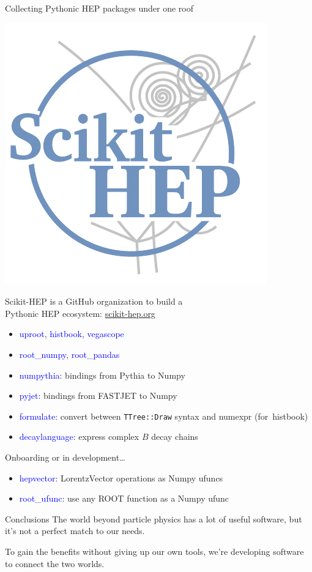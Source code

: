 \documentclass[aspectratio=169]{beamer}
\begin{document}
\begin{frame}{Collecting Pythonic HEP packages under one roof}
\Large
\vspace{0.35 cm}

\hfill \includegraphics[height=3.5 cm]{skhep-logo.pdf}

\vspace{-3.5 cm}
Scikit-HEP is a GitHub organization to build a \\ Pythonic HEP ecosystem: \textcolor{blue}{\url{scikit-hep.org}}

\large
\begin{itemize}
\item \textcolor{blue}{uproot}, \textcolor{blue}{histbook}, \textcolor{blue}{vegascope}
\item \textcolor{blue}{root\_numpy}, \textcolor{blue}{root\_pandas}
\item \textcolor{blue}{numpythia}: bindings from Pythia to Numpy
\item \textcolor{blue}{pyjet}: bindings from FASTJET to Numpy
\item \textcolor{blue}{formulate}: convert between {\tt\normalsize TTree::Draw} syntax and numexpr \mbox{(for histbook)\hspace{-1 cm}}
\item \textcolor{blue}{decaylanguage}: express complex $B$ decay chains
\end{itemize}

\Large
Onboarding or in development\ldots

\large
\begin{itemize}
\item \textcolor{blue}{hepvector}: LorentzVector operations as Numpy ufuncs
\item \textcolor{blue}{root\_ufunc}: use any ROOT function as a Numpy ufunc
\end{itemize}
\end{frame}

\begin{frame}{Conclusions}
\Large
\vspace{1 cm}
The world beyond particle physics has a lot of useful software, but it's not a perfect match to our needs.

\vspace{0.5 cm}
To gain the benefits without giving up our own tools, we're developing software to connect the two worlds.

\vspace{0.5 cm}
\mbox{ }
\end{frame}
\end{document}
